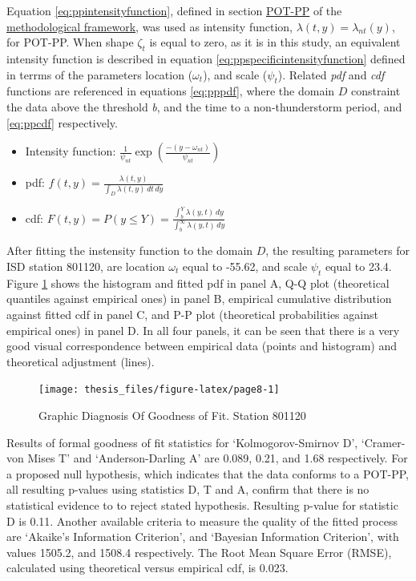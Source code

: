 \documentclass[12pt,oneside]{reedthesis}
\begin{document}
Equation \eqref{eq:ppintensityfunction}, defined in section \protect\hyperlink{method-pot-pp}{POT-PP} of the \protect\hyperlink{rmd-thefra}{methodological framework}, was used as intensity function, \(\lambda(t, y) = \lambda_{nt}(y)\), for POT-PP. When shape \(\zeta_t\) is equal to zero, as it is in this study, an equivalent intensity function is described in equation \eqref{eq:ppspecificintensityfunction} defined in terrms of the parameters location (\(\omega_t\)), and scale (\(\psi_t\)). Related \emph{pdf} and \emph{cdf} functions are referenced in equations \eqref{eq:pppdf}, where the domain \(D\) constraint the data above the threshold \emph{b}, and the time to a non-thunderstorm period, and \eqref{eq:ppcdf} respectively.
\begin{itemize}
\item
  Intensity function: \(\frac{1}{\psi_{nt}}\exp\left(\frac{-(y-\omega_{nt})}{\psi_{nt}}\right)\)
\item
  pdf: \(f(t,y) = \frac{\lambda(t,y)}{\int_D\lambda(t,y)\,dt\,dy}\)
\item
  cdf: \(F(t,y) = P(y \leq Y) = \frac{\int_b^Y\lambda(y,t)\,dy}{\int_b^\infty\lambda(y,t)\,dy}\)
\end{itemize}
After fitting the instensity function to the domain \(D\), the resulting parameters for ISD station 801120, are location \(\omega_t\) equal to -55.62, and scale \(\psi_t\) equal to 23.4. Figure \ref{fig:page8} shows the histogram and fitted pdf in panel A, Q-Q plot (theoretical quantiles against empirical ones) in panel B, empirical cumulative distribution against fitted cdf in panel C, and P-P plot (theoretical probabilities against empirical ones) in panel D. In all four panels, it can be seen that there is a very good visual correspondence between empirical data (points and histogram) and theoretical adjustment (lines).
\begin{figure}

{\centering \texttt{[image: thesis\_files/figure-latex/page8-1]} 

}

\caption{Graphic Diagnosis Of Goodness of Fit. Station 801120}\label{fig:page8}
\end{figure}
Results of formal goodness of fit statistics for `Kolmogorov-Smirnov D', `Cramer-von Mises T' and `Anderson-Darling A' are 0.089, 0.21, and 1.68 respectively. For a proposed null hypothesis, which indicates that the data conforms to a POT-PP, all resulting p-values using statistics D, T and A, confirm that there is no statistical evidence to to reject stated hypothesis. Resulting p-value for statistic D is 0.11. Another available criteria to measure the quality of the fitted process are `Akaike's Information Criterion', and `Bayesian Information Criterion', with values 1505.2, and 1508.4 respectively. The Root Mean Square Error (RMSE), calculated using theoretical versus empirical cdf, is 0.023.
\end{document}
